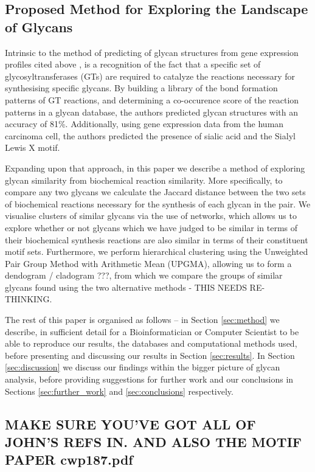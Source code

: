 \documentclass[12pt,a4paper]{article}
\begin{document}
\subsection{Proposed Method for Exploring the Landscape of Glycans}
\label{sec:proposed_method}
Intrinsic to the method of predicting of glycan structures from gene expression profiles cited above \citep{doi:10.1093/bioinformatics/bti666}, is a recognition of the fact that a specific set of glycosyltransferases (GTs) are required to catalyze the reactions necessary for synthesising specific glycans. By building a library of the bond formation patterns of GT reactions, and determining a co-occurence score of the reaction patterns in a glycan database, the authors predicted glycan structures with an accuracy of 81\%. Additionally, using gene expression data from the human carcinoma cell, the authors predicted the presence of sialic acid and the Sialyl Lewis X motif.

Expanding upon that approach, in this paper we describe a method of exploring glycan similarity from biochemical reaction similarity. More specifically, to compare any two glycans we calculate the Jaccard distance between the two sets of biochemical reactions necessary for the synthesis of each glycan in the pair. We visualise clusters of similar glycans via the use of networks, which allows us to explore whether or not glycans which we have judged to be similar in terms of their biochemical synthesis reactions are also similar in terms of their constituent motif sets. Furthermore, we perform hierarchical clustering using the Unweighted Pair Group Method with Arithmetic Mean (UPGMA), allowing us to form a dendogram / cladogram ???, from which we compare the groups of similar glycans found using the two alternative methods - THIS NEEDS RE-THINKING.

The rest of this paper is organised as follows -- in Section \ref{sec:method} we describe, in sufficient detail for a Bioinformatician or Computer Scientist to be able to reproduce our results, the databases and computational methods used, before presenting and discussing our results in Section \ref{sec:results}. In Section \ref{sec:discussion} we discuss our findings within the bigger picture of glycan analysis, before providing suggestions for further work and our conclusions in Sections \ref{sec:further_work} and \ref{sec:conclusions} respectively.


\subsection{MAKE SURE YOU'VE GOT ALL OF JOHN'S REFS IN. AND ALSO THE MOTIF PAPER cwp187.pdf}
\end{document}
